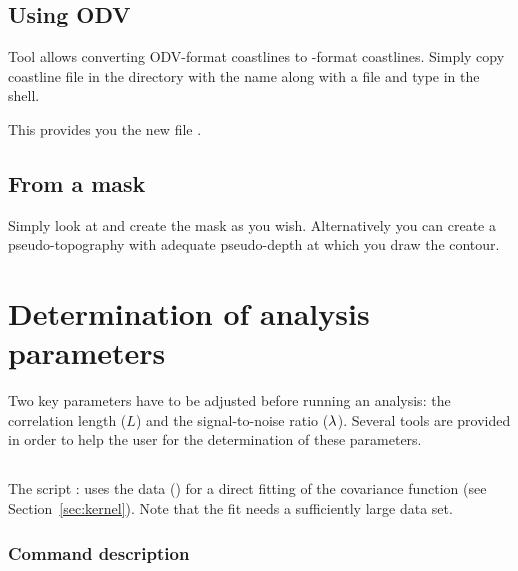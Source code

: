 \subsection{Using ODV}

Tool  allows converting ODV-format coastlines to \diva-format coastlines. Simply copy coastline file in the  directory with the name  along with a  file and type  in the shell. 

This provides you the new file .



\subsection{From a mask}

Simply look at  and create the mask as you wish. Alternatively you can
create a pseudo-topography with adequate pseudo-depth at which you draw the contour.


\section{Determination of analysis parameters}

Two key parameters have to be adjusted before running an analysis: the correlation length ($L$) and the signal-to-noise ratio ($\lambda$). Several tools are provided in order to help the user for the determination of these parameters.


\subsection{ \label{sec:divafit}}

The script : uses the data () for a direct fitting of the covariance function (see Section~\ref{sec:kernel}). Note that the fit needs a sufficiently large data set.

\subsubsection{Command description}

